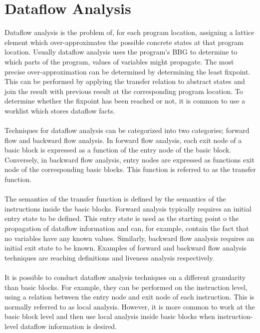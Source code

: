 \documentclass{kththesis}
\newcommand{\fbcomment}[1]{{#1}}
\renewcommand{\fbcomment}[1]{}
\begin{document}
\section{Dataflow Analysis}
\fbcomment{\color{red}Goal: Give the reader an understanding of the context of the CPA algorithm(The core worklist algorithm which which is based on theory from dataflow analysis)}
Dataflow analysis is the problem of, for each program location, assigning a lattice element which over-approximates the possible concrete states at that program location\cite{cpaAlgo}. Usually dataflow analysis uses the program's BBG to determine to which parts of the program, values of variables might propagate. The most precise over-approximation can be determined by determining the least fixpoint. This can be performed by applying the transfer relation to abstract states and join the result with previous result at the corresponding program location. To determine whether the fixpoint has been reached or not, it is common to use a worklist which stores dataflow facts\cite{cpaAlgo}.
\\ \\
Techniques for dataflow analysis can be categorized into two categories; forward flow and backward flow analysis. In forward flow analysis, each exit node of a basic block is expressed as a function of the entry node of the basic block. Conversely, in backward flow analysis, entry nodes are expressed as functions exit node of the corresponding basic blocks. This function is referred to as the transfer function.
\\ \\
The semantics of the transfer function is defined by the semantics of the instructions inside the basic blocks. Forward analysis typically requires an initial entry state to be defined. This entry state is used as the starting point o the propagation of dataflow information and can, for example, contain the fact that no variables have any known values. Similarly, backward flow analysis requires an initial exit state to be known. Examples of forward and backward flow analysis techniques are reaching definitions and liveness analysis respectively.
\\ \\
It is possible to conduct dataflow analysis techniques on a different granularity than basic blocks. For example, they can be performed on the instruction level, using a relation between the entry node and exit node of each instruction. This is normally referred to as local analysis\cite{carneigeDataFlow}. However, it is more common to work at the basic block level and then use local analysis inside basic blocks when instruction-level dataflow information is desired\cite{carneigeDataFlow}.
\end{document}
